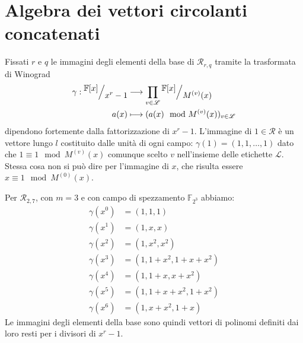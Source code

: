 \section{Algebra dei vettori circolanti concatenati}
Fissati $r$ e $q$ le immagini degli elementi della base di $\mathcal{R}_{r,q}$ tramite la trasformata di Winograd
\begin{align*}
  \gamma :  \quotient{\mathbb{F} \lbrack x \rbrack  }{x^{r} - 1}  
      & \longrightarrow  
      \prod_{v\in \mathscr{L}} \quotient{\mathbb{F} \lbrack x \rbrack  }{M^{(v)}(x)}   \\
      a(x) &\longmapsto  ( a(x)\mod{M^{(v)}(x)})_{v\in \mathscr{L}}
  \end{align*}
dipendono fortemente dalla fattorizzazione di $x^r-1$. L'immagine di $1 \in \mathcal{R}$ è un vettore lungo $l$ costituito dalle unità di ogni campo: $\gamma(1) = (1,1,\dots ,1)$ dato che $1 \equiv 1 \mod M^{(v)}(x)$ comunque scelto $v$ nell'insieme delle etichette $\mathscr{L}$. Stessa cosa non si può dire per l'immagine di $x$, che risulta essere $x \equiv 1 \mod M^{(0)}(x)$.
\begin{esempio} \label{ese:primoSuTrasf}
   Per $\mathcal{R}_{2,7}$, con $m = 3$ e con campo di spezzamento $\mathbb{F}_{2^3}$ abbiamo:
\begin{align*}   
  \gamma(x^0) &= (1,1,1)  \\
  \gamma(x^1) &= (1,x,x) \\
  \gamma(x^2) &= (1,x^2,x^2)  \\
  \gamma(x^3) &= (1,1+x^2,1+x+x^2)  \\
  \gamma(x^4) &= (1,1+x,x+x^2)  \\
  \gamma(x^5) &= (1,1+x+x^2,1+x^2)  \\
  \gamma(x^6) &= (1,x+x^2,1+x) 
\end{align*}
Le immagini degli elementi della base sono quindi vettori di polinomi definiti dai loro resti per i divisori di $x^r-1$. 
\end{esempio}

